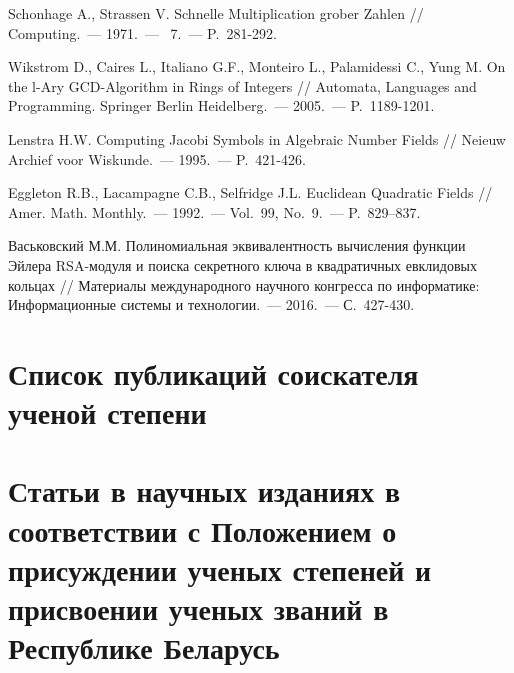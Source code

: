 \documentclass[_00_dissertation.tex]{subfiles}
\begin{document}
\begin{thebibliography}{99}
    Schonhage A., Strassen V. Schnelle Multiplication grober Zahlen // Computing.~--- 1971.~--- \textnumero~7.~--- P.~281-292.

    Wikstrom D., Caires L., Italiano G.F., Monteiro L., Palamidessi C., Yung M. On the l-Ary GCD-Algorithm in Rings of Integers // Automata, Languages and Programming. Springer Berlin Heidelberg.~--- 2005.~--- P.~1189-1201.

    Lenstra H.W. Computing Jacobi Symbols in Algebraic Number Fields // Neieuw Archief voor Wiskunde.~--- 1995.~--- P.~421-426.

    Eggleton R.B., Lacampagne C.B., Selfridge J.L. Euclidean Quadratic Fields // Amer. Math. Monthly.~--- 1992.~--- Vol.~99, No.~9.~--- P.~829--837.

    Васьковский М.М. Полиномиальная эквивалентность вычисления функции Эйлера RSA-модуля и поиска секретного ключа в квадратичных евклидовых кольцах // Материалы международного научного конгресса по информатике: Информационные системы и технологии.~--- 2016.~--- С.~427-430.

\end{thebibliography}

\section*{Список публикаций соискателя ученой степени}

\renewcommand{\labelenumi}{\arabic{enumi}--A}
\renewcommand{\theenumi}{\arabic{enumi}--A}

\vspace{-4ex}
\section*{\fontsize{14}{15}\selectfont Статьи в научных изданиях в соответствии с Положением о присуждении ученых степеней и присвоении ученых званий в Республике Беларусь}
\vspace{-4ex}
\end{document}
